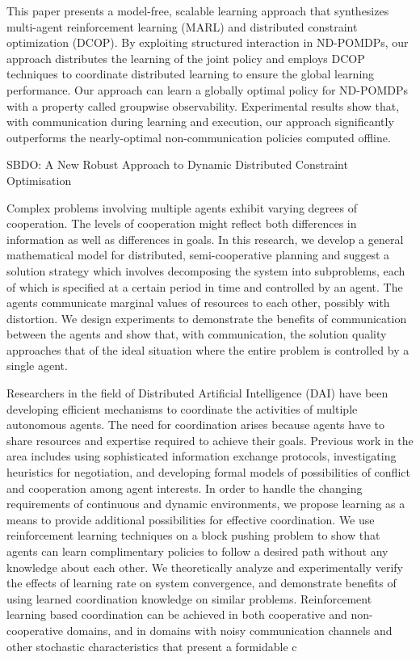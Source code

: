 \documentclass[conference]{IEEEtran}
\begin{document}
\cite{zhang2011coordinated} This paper presents a
model-free, scalable learning approach that synthesizes
multi-agent reinforcement learning (MARL) and distributed
constraint optimization (DCOP). By exploiting
structured interaction in ND-POMDPs, our approach
distributes the learning of the joint policy and employs
DCOP techniques to coordinate distributed learning to
ensure the global learning performance. Our approach
can learn a globally optimal policy for ND-POMDPs
with a property called groupwise observability. Experimental
results show that, with communication during
learning and execution, our approach significantly outperforms
the nearly-optimal non-communication policies
computed offline.

SBDO: A New Robust Approach to Dynamic Distributed Constraint Optimisation

\cite{zhang2013coordinating}

\cite{banerjee2012sample}

\cite{kraemer2012informed}

\cite{}
Complex problems involving multiple agents exhibit varying degrees of
cooperation. The levels of cooperation might reflect both differences in
information as well as differences in goals. In this research, we develop a
general mathematical model for distributed, semi-cooperative planning and
suggest a solution strategy which involves decomposing the system into
subproblems, each of which is specified at a certain period in time and
controlled by an agent. The agents communicate marginal values of resources to
each other, possibly with distortion. We design experiments to demonstrate the
benefits of communication between the agents and show that, with
communication, the solution quality approaches that of the ideal situation
where the entire problem is controlled by a single agent.

\cite{sen1994learning}
Researchers in the field of Distributed Artificial
Intelligence (DAI) have been developing efficient
mechanisms to coordinate the activities of multiple
autonomous agents. The need for coordination
arises because agents have to share resources
and expertise required to achieve their goals.
Previous work in the area includes using sophisticated
information exchange protocols, investigating
heuristics for negotiation, and developing
formal models of possibilities of conflict and cooperation
among agent interests. In order to handle
the changing requirements of continuous and
dynamic environments, we propose learning as a
means to provide additional possibilities for effective
coordination. We use reinforcement learning
techniques on a block pushing problem to show
that agents can learn complimentary policies to
follow a desired path without any knowledge
about each other. We theoretically analyze and
experimentally verify the effects of learning rate
on system convergence, and demonstrate benefits
of using learned coordination knowledge on similar
problems. Reinforcement learning based coordination
can be achieved in both cooperative and
non-cooperative domains, and in domains with
noisy communication channels and other stochastic
characteristics that present a formidable c
\end{document}

